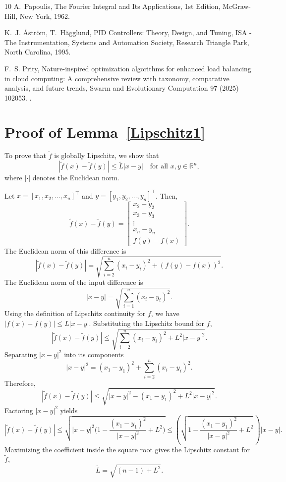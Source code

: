 \documentclass[preprint,12pt]{elsarticle}
\begin{document}
\begin{thebibliography}{10}
	A.~Papoulis, The Fourier Integral and Its Applications, 1st Edition,
	McGraw-Hill, New York, 1962.
	
	K.~J. \AA{}str\"{o}m, T.~H\"{a}gglund, PID Controllers: Theory, Design, and
	Tuning, ISA - The Instrumentation, Systems and Automation Society, Research
	Triangle Park, North Carolina, 1995.
	
	F.~S. Prity, Nature-inspired optimization algorithms for enhanced load
	balancing in cloud computing: A comprehensive review with taxonomy,
	comparative analysis, and future trends, Swarm and Evolutionary Computation
	97 (2025) 102053.
	\newblock \href {https://doi.org/10.1016/j.swevo.2025.102053}
	{}.
	
\end{thebibliography}



\appendix 
\section{Proof of Lemma~\ref{Lipschitz1}}\label{app:Lipschitz}    %
To prove that \( \tilde{f} \) is globally Lipschitz, we show that  
\[
|\tilde{f}(x) - \tilde{f}(y)| \leq \tilde{L} |x - y| \quad \text{for all } x, y \in \mathbb{R}^n,
\]  
where \( |\cdot| \) denotes the Euclidean norm.  

Let \( x = [x_1, x_2, \dots, x_n]^\top \) and \( y = [y_1, y_2, \dots, y_n]^\top \). Then,  
\[
\tilde{f}(x) - \tilde{f}(y) = \begin{bmatrix} x_2 - y_2 \\ x_3 - y_3 \\ \vdots \\ x_n - y_n \\ f(y) - f(x) \end{bmatrix}.
\]  
The Euclidean norm of this difference is  
\[
|\tilde{f}(x) - \tilde{f}(y)| = \sqrt{\sum_{i=2}^n (x_i - y_i)^2 + (f(y) - f(x))^2}.
\]
The Euclidean norm of the input difference is  
\[
|x - y| = \sqrt{\sum_{i=1}^n (x_i - y_i)^2}.
\]  
Using the definition of Lipschitz continuity for \( f \), we have  
\(
|f(x) - f(y)| \leq L |x - y|. 
\)
Substituting the Lipschitz bound for \( f \),  
\[
|\tilde{f}(x) - \tilde{f}(y)| \leq \sqrt{\sum_{i=2}^n (x_i - y_i)^2 + L^2 |x - y|^2}.
\]
Separating \( |x - y|^2 \) into its components 
\[
|x - y|^2 = (x_1 - y_1)^2 + \sum_{i=2}^n (x_i - y_i)^2.
\]  
Therefore,  
\[
|\tilde{f}(x) - \tilde{f}(y)| \leq \sqrt{|x - y|^2 - (x_1 - y_1)^2 + L^2 |x - y|^2}.
\]
Factoring \( |x - y|^2 \) yields
\[
|\tilde{f}(x) - \tilde{f}(y)| \leq \sqrt{|x - y|^2 \big(1 - \frac{(x_1 - y_1)^2}{|x - y|^2} + L^2\big)}\leq \left(\sqrt{1 - \frac{(x_1 - y_1)^2}{|x - y|^2} + L^2}\,\right)|x - y|.
\]
Maximizing the coefficient inside the square root gives the Lipschitz constant for \( \tilde{f} \),  
\[
\tilde{L} = \sqrt{(n-1) + L^2}.
\]  
\end{document}
